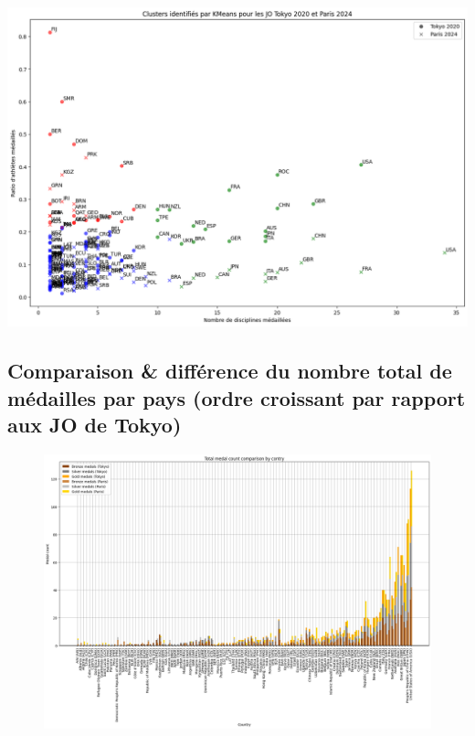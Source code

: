 \documentclass{article}
\begin{document}
\includegraphics[width=\linewidth]{assets/athletes_disciplines_clusters.png}

\clearpage
\subsection{Comparaison \& différence du nombre total de médailles par pays (ordre croissant par rapport aux JO de Tokyo)}
\label{annexe_comp_nb_total_medailles_par_pays}

\begin{figure}[H]
    \center
    
    \includegraphics[width=1.0998\linewidth]{assets/comp_nb_total_medailles_par_pays.png}
\end{figure}
\end{document}
